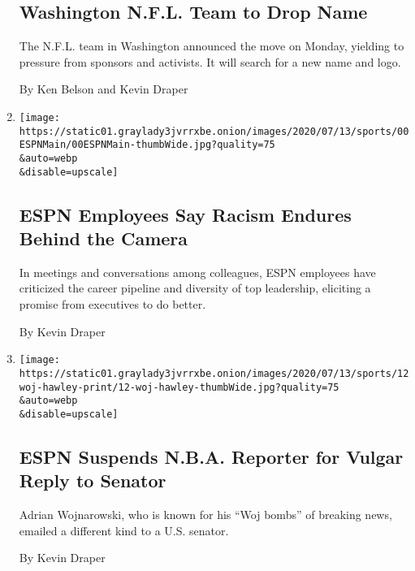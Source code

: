 \begin{enumerate}
  \hypertarget{washington-nfl-team-to-drop-name}{%
  \subsection{Washington N.F.L. Team to Drop
  Name}\label{washington-nfl-team-to-drop-name}}

  The N.F.L. team in Washington announced the move on Monday, yielding
  to pressure from sponsors and activists. It will search for a new name
  and logo.

  By Ken Belson and Kevin Draper
\item
  \href{/2020/07/13/sports/espn-racism-black-employees.html}{}

  \texttt{[image: https://static01.graylady3jvrrxbe.onion/images/2020/07/13/sports/00ESPNMain/00ESPNMain-thumbWide.jpg?quality=75\\\&auto=webp\\\&disable=upscale]}

  \hypertarget{espn-employees-say-racism-endures-behind-the-camera}{%
  \subsection{ESPN Employees Say Racism Endures Behind the
  Camera}\label{espn-employees-say-racism-endures-behind-the-camera}}

  In meetings and conversations among colleagues, ESPN employees have
  criticized the career pipeline and diversity of top leadership,
  eliciting a promise from executives to do better.

  By Kevin Draper
\item
  \href{/2020/07/12/sports/basketball/espn-suspends-woj.html}{}

  \texttt{[image: https://static01.graylady3jvrrxbe.onion/images/2020/07/13/sports/12woj-hawley-print/12-woj-hawley-thumbWide.jpg?quality=75\\\&auto=webp\\\&disable=upscale]}

  \hypertarget{espn-suspends-nba-reporter-for-vulgar-reply-to-senator}{%
  \subsection{ESPN Suspends N.B.A. Reporter for Vulgar Reply to
  Senator}\label{espn-suspends-nba-reporter-for-vulgar-reply-to-senator}}

  Adrian Wojnarowski, who is known for his ``Woj bombs'' of breaking
  news, emailed a different kind to a U.S. senator.

  By Kevin Draper
\end{enumerate}

